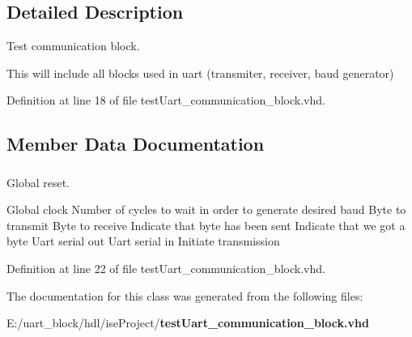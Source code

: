 \subsection{Detailed Description}
Test communication block. 

This will include all blocks used in uart (transmiter, receiver, baud generator) 

Definition at line 18 of file test\-Uart\-\_\-communication\-\_\-block.\-vhd.



\subsection{Member Data Documentation}
\subsubsection[{uart\-\_\-communication\-\_\-blocks}]{ {\bfseries  } \hspace{0.3cm}{\ttfamily  [Component]}}\label{classtest_uart__communication__block_1_1behavior_a18ccf3bd92a7406c724baa00eaa9b168}


Global reset. 

Global clock Number of cycles to wait in order to generate desired baud Byte to transmit Byte to receive Indicate that byte has been sent Indicate that we got a byte Uart serial out Uart serial in Initiate transmission 

Definition at line 22 of file test\-Uart\-\_\-communication\-\_\-block.\-vhd.



The documentation for this class was generated from the following files\-:\begin{DoxyCompactItemize}
\item 
E\-:/uart\-\_\-block/hdl/ise\-Project/{\bf test\-Uart\-\_\-communication\-\_\-block.\-vhd}\end{DoxyCompactItemize}
